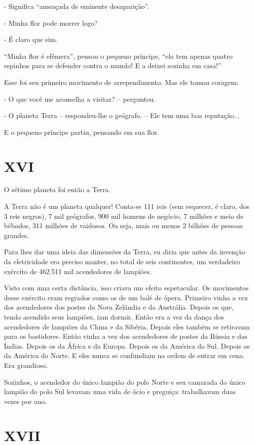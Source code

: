 - Significa ``ameaçada de eminente desaparição''.

- Minha flor pode morrer logo?

- É claro que sim.

``Minha flor é efêmera'', pensou o pequeno príncipe, ``ela tem apenas
quatro espinhos para se defender contra o mundo! E a deixei sozinha em
casa!''

Esse foi seu primeiro movimento de arrependimento. Mas ele tomou
coragem:

- O que você me aconselha a visitar? -- perguntou.

- O planeta Terra -- respondeu-lhe o geógrafo. -- Ele tem uma boa
reputação...

E o pequeno príncipe partiu, pensando em sua flor.

\chapter{XVI}

O sétimo planeta foi então a Terra.

A Terra não é um planeta qualquer! Conta-se 111 reis (sem esquecer, é
claro, dos 3 reis negros), 7 mil geógrafos, 900 mil homens de negócio, 7
milhões e meio de bêbados, 311 milhões de vaidosos. Ou seja, mais ou
menos 2 bilhões de pessoas grandes.

Para lhes dar uma ideia das dimensões da Terra, eu diria que antes da
invenção da eletricidade era preciso manter, no total de seis
continentes, um verdadeiro exército de 462.511 mil acendedores de
lampiões.

Visto com uma certa distância, isso criava um efeito espetacular. Os
movimentos desse exército eram regrados como os de um balé de ópera.
Primeiro vinha a vez dos acendedores dos postes da Nova Zelândia e da
Austrália. Depois os que, tendo acendido seus lampiões, iam dormir.
Então era a vez da dança dos acendedores de lampiões da China e da
Sibéria. Depois eles também se retiravam para os bastidores. Então vinha
a vez dos acendedores de postes da Rússia e das Índias. Depois os da
África e da Europa. Depois os da América do Sul. Depois os da América do
Norte. E eles nunca se confundiam na ordem de entrar em cena. Era
grandioso.

Sozinhos, o acendedor do único lampião do polo Norte e seu camarada do
único lampião do polo Sul levavam uma vida de ócio e preguiça:
trabalhavam duas vezes por ano.

\chapter{XVII}

